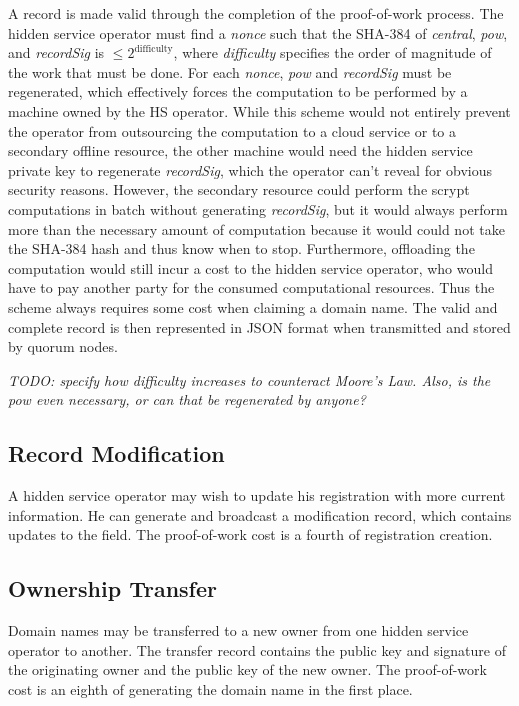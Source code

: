 A record is made valid through the completion of the proof-of-work process. The hidden service operator must find a \emph{nonce} such that the SHA-384 of \emph{central}, \emph{pow}, and \emph{recordSig} is $ \leq 2^\textrm{difficulty} $, where \emph{difficulty} specifies the order of magnitude of the work that must be done. For each \emph{nonce}, \emph{pow} and \emph{recordSig} must be regenerated, which effectively forces the computation to be performed by a machine owned by the HS operator. While this scheme would not entirely prevent the operator from outsourcing the computation to a cloud service or to a secondary offline resource, the other machine would need the hidden service private key to regenerate \emph{recordSig}, which the operator can't reveal for obvious security reasons. However, the secondary resource could perform the scrypt computations in batch without generating \emph{recordSig}, but it would always perform more than the necessary amount of computation because it would could not take the SHA-384 hash and thus know when to stop. Furthermore, offloading the computation would still incur a cost to the hidden service operator, who would have to pay another party for the consumed computational resources. Thus the scheme always requires some cost when claiming a domain name. The valid and complete record is then represented in JSON format when transmitted and stored by quorum nodes.

\emph{TODO: specify how difficulty increases to counteract Moore's Law. Also, is the pow even necessary, or can that be regenerated by anyone?}

\subsection{Record Modification}

A hidden service operator may wish to update his registration with more current information. He can generate and broadcast a modification record, which contains updates to the field. The proof-of-work cost is a fourth of registration creation.

\subsection{Ownership Transfer}

Domain names may be transferred to a new owner from one hidden service operator to another. The transfer record contains the public key and signature of the originating owner and the public key of the new owner. The proof-of-work cost is an eighth of generating the domain name in the first place.

